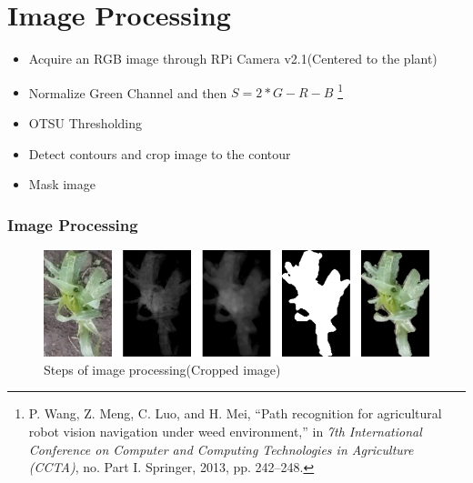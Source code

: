 \documentclass[10pt,a4paper]{beamer}
\begin{document}
\section{Image Processing}
\begin{frame}
\begin{itemize}
	\item Acquire  an RGB image through RPi Camera v2.1(Centered to the plant)
	
	\item Normalize Green Channel and then $S = 2*G - R - B$ \footnote{ P. Wang, Z. Meng, C. Luo, and H. Mei, “Path recognition for agricultural robot vision navigation under weed environment,” in \textit{7th International Conference on Computer and Computing Technologies in Agriculture (CCTA)}, no. Part I. Springer, 2013, pp. 242–248.
}
	\item OTSU Thresholding
	\item Detect contours and crop image to the contour 
	\item Mask image
	
\end{itemize}
\frametitle{Image Processing}
	\begin{figure}[h]
	\centering
	\includegraphics[width=3.5 in]{SegmentationPaper}
	\caption{Steps of image processing(Cropped image)}
	\label{figure4}
	\end{figure}
\end{frame}
\end{document}
